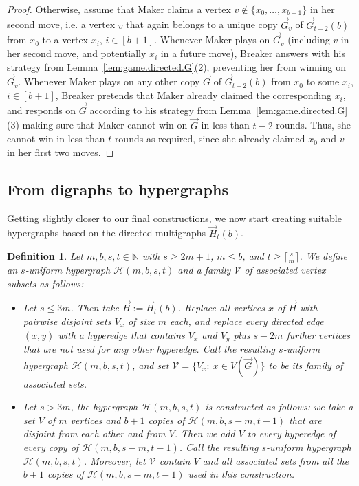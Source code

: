 \documentclass[reqno, 12pt]{amsart}
\numberwithin{equation}{section}
\numberwithin{figure}{section}
\newtheorem{definition}[theorem]{Definition}
\begin{document}
\begin{proof}
Otherwise, assume that Maker claims a vertex $v\notin \{x_0,\ldots,x_{b+1}\}$ in her second move, i.e. a vertex $v$ that again belongs to a unique copy $\vec{G}_v$ of $\vec{G}_{t-2}(b)$ from $x_0$ to a vertex $x_i$, $i\in [b+1]$. Whenever Maker plays on $\vec{G}_v$ (including $v$ in her second move, and potentially $x_i$ in a future move), Breaker answers with his strategy from Lemma~\ref{lem:game.directed.G}(2), preventing her from winning on $\vec{G}_v$. Whenever Maker plays on any other copy $\vec{G}$ of $\vec{G}_{t-2}(b)$ from $x_0$ to some $x_i$, $i \in [b+1]$, Breaker pretends that Maker already claimed the corresponding $x_i$, and responds on $\vec{G}$ according to his strategy from Lemma~\ref{lem:game.directed.G}(3) making sure that Maker cannot win on $\vec{G}$ in less than $t-2$ rounds. Thus, she cannot win in less than $t$ rounds as required, since she already claimed $x_0$ and $v$ in her first two moves.
\end{proof}


\smallskip

\subsection{From digraphs to hypergraphs}\label{sec:branched.paths}
Getting slightly closer to our final constructions, we now start creating suitable hypergraphs based on the directed
multigraphs $\vec{H}_t(b)$. 

\begin{definition}\label{def:hypergraph.H}
	Let $m,b,s,t \in \mathbb{N}$ with $s \geq 2m+1$, $m \leq b$, and $t \geq \lceil \frac{s}{m} \rceil$.
	We define an $s$-uniform hypergraph
	$\mathcal{H}(m,b,s,t)$ 
    and a family $\mathcal{V}$ of associated vertex subsets	
	as follows:
	\begin{itemize}
		\item[(a)] Let $s\leq 3m$. Then take 
		$\vec{H} := \vec{H}_t(b)$.
		Replace all vertices $x$ of $\vec{H}$ with
		pairwise disjoint sets $V_x$ of size $m$ each,
		and replace every directed edge $(x,y)$
		with a hyperedge that contains
		$V_x$ and $V_y$ plus $s-2m$ further vertices
		that are not used for any other hyperedge.
		Call the resulting $s$-uniform hypergraph 
			$\mathcal{H}(m,b,s,t)$, and 
		set $\mathcal{V}=\{V_x:~x\in V(\vec{G})\}$
		to be its family of associated sets.
		
		\item[(b)] Let $s > 3m$, the hypergraph 
		$\mathcal{H}(m,b,s,t)$ is constructed as follows: 
		we take a set $V$ of $m$ vertices 
		and $b+1$ copies of $\mathcal{H}(m,b,s-m,t-1)$
        that are disjoint from each other and from $V$.	
        Then we add $V$ to every hyperedge of every copy of 
        $\mathcal{H}(m,b,s-m,t-1)$.
        Call the resulting $s$-uniform hypergraph 
			$\mathcal{H}(m,b,s,t)$.
		Moreover, let $\mathcal{V}$  
		contain $V$ and all associated sets from all 
		the $b+1$ copies of 
		$\mathcal{H}(m,b,s-m,t-1)$ used in this construction.
	\end{itemize}

\end{definition}
\end{document}
